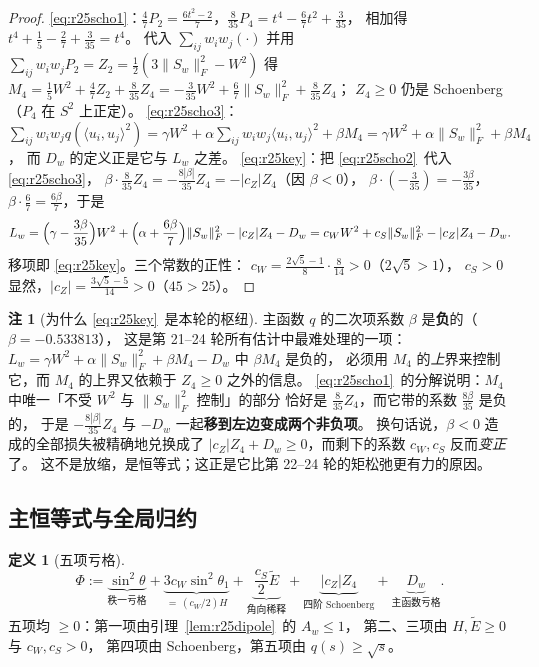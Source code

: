 \documentclass[UTF8,11pt]{ctexart}
\theoremstyle{definition}
\newtheorem{definition}[theorem]{定义}
\newtheorem{remark}[theorem]{注}
\begin{document}
\begin{proof}
\eqref{eq:r25scho1}：$\frac47P_2=\frac{6t^2-2}7$，$\frac8{35}P_4=t^4-\frac67t^2+\frac3{35}$，
相加得 $t^4+\frac15-\frac27+\frac3{35}=t^4$。
代入 $\sum_{ij}w_iw_j(\cdot)$ 并用 $\sum_{ij}w_iw_jP_2=Z_2=\frac12(3\|S_w\|_F^2-W^2)$ 得
$M_4=\frac15W^2+\frac47Z_2+\frac8{35}Z_4=-\frac3{35}W^2+\frac67\|S_w\|_F^2+\frac8{35}Z_4$；
$Z_4\ge0$ 仍是 Schoenberg（$P_4$ 在 $S^2$ 上正定）。
\eqref{eq:r25scho3}：$\sum_{ij}w_iw_jq(\langle u_i,u_j\rangle^2)
=\gamma W^2+\alpha\sum_{ij}w_iw_j\langle u_i,u_j\rangle^2+\beta M_4
=\gamma W^2+\alpha\|S_w\|_F^2+\beta M_4$，
而 $D_w$ 的定义正是它与 $L_w$ 之差。
\eqref{eq:r25key}：把 \eqref{eq:r25scho2}~代入 \eqref{eq:r25scho3}，
$\beta\cdot\frac8{35}Z_4=-\frac{8|\beta|}{35}Z_4=-|c_Z|Z_4$（因 $\beta<0$），
$\beta\cdot(-\frac3{35})=-\frac{3\beta}{35}$，$\beta\cdot\frac67=\frac{6\beta}7$，于是
\[
L_w=\Bigl(\gamma-\frac{3\beta}{35}\Bigr)W^2+\Bigl(\alpha+\frac{6\beta}7\Bigr)\|S_w\|_F^2
-|c_Z|Z_4-D_w=c_WW^2+c_S\|S_w\|_F^2-|c_Z|Z_4-D_w .
\]
移项即 \eqref{eq:r25key}。三个常数的正性：
$c_W=\frac{2\sqrt5-1}8\cdot\frac8{14}>0$（$2\sqrt5>1$），
$c_S>0$ 显然，$|c_Z|=\frac{3\sqrt5-5}{14}>0$（$45>25$）。
\end{proof}

\begin{remark}[为什么 \eqref{eq:r25key}~是本轮的枢纽]\label{rem:r25key}
主函数 $q$ 的二次项系数 $\beta$ 是\textbf{负}的（$\beta=-0.533813$），
这是第 21--24 轮所有估计中最难处理的一项：
$L_w=\gamma W^2+\alpha\|S_w\|_F^2+\beta M_4-D_w$ 中 $\beta M_4$ 是负的，
必须用 $M_4$ 的\emph{上}界来控制它，而 $M_4$ 的上界又依赖于 $Z_4\ge0$ 之外的信息。
\eqref{eq:r25scho1}~的分解说明：$M_4$ 中唯一「不受 $W^2$ 与 $\|S_w\|_F^2$ 控制」的部分
恰好是 $\frac8{35}Z_4$，而它带的系数 $\frac{8\beta}{35}$ 是负的，
于是 $-\frac{8|\beta|}{35}Z_4$ 与 $-D_w$ 一起\textbf{移到左边变成两个非负项}。
换句话说，$\beta<0$ 造成的全部损失被精确地兑换成了
$|c_Z|Z_4+D_w\ge0$，而剩下的系数 $c_W,c_S$ 反而\emph{变正}了。
这不是放缩，是恒等式；这正是它比第 22--24 轮的矩松弛更有力的原因。
\end{remark}

\subsection{主恒等式与全局归约}\label{sec:r25:main}

\begin{definition}[五项亏格]\label{def:r25phi}
\begin{equation}\label{eq:r25phi}
\Phi:=\underbrace{\sin^2\theta}_{\text{秩一亏格}}
+\underbrace{3c_W\sin^2\theta_1}_{=\,(c_W/2)H}
+\underbrace{\frac{c_S}2\widetilde E}_{\text{角向稀释}}
+\underbrace{|c_Z|Z_4}_{\text{四阶 Schoenberg}}
+\underbrace{D_w}_{\text{主函数亏格}} .
\end{equation}
五项均 $\ge0$：第一项由引理~\ref{lem:r25dipole}~的 $A_w\le1$，
第二、三项由 $H,\widetilde E\ge0$ 与 $c_W,c_S>0$，
第四项由 Schoenberg，第五项由 $q(s)\ge\sqrt s$。
\end{definition}
\end{document}

